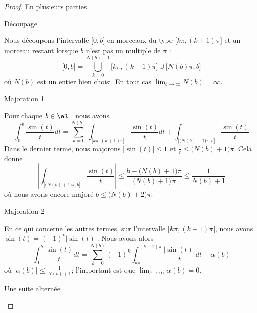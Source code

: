 \begin{proof}
	En plusieurs parties.
	\begin{subproof}
		\item[Découpage]

		Nous découpons l'intervalle \( \mathopen[ 0 , b \mathclose]\) en morceaux du type \( \mathopen[ k\pi , (k+1)\pi \mathclose]\) et un morceau restant lorsque \( b\) n'est pas un multiple de \( \pi\) :
		\begin{equation}
			\mathopen[ 0 , b \mathclose]=\bigcup_{k=0}^{N(b)-1}\mathopen[ k\pi , (k+1)\pi \mathclose]\cup\mathopen[ N(b)\pi , b \mathclose]
		\end{equation}
		où \( N(b)\) est un entier bien choisi. En tout cas \( \lim_{b\to \infty}N(b)=\infty\).

		\item[Majoration 1]

		Pour chaque \( b\in \eR^+\) nous avons
		\begin{equation}
			\int_0^b\frac{ \sin(t) }{ t }dt=\sum_{k=0}^{N(b)}\int_{\mathopen\big[ k\pi , (k+1)\pi \mathclose\big]}\frac{ \sin(t) }{ t }dt+\int_{\mathopen[ \big( N(b)+1 \big)\pi , b \mathclose]}\frac{ \sin(t) }{ t }
		\end{equation}
		Dans le dernier terme, nous majorons \( | \sin(t) |\leq 1\) et \( \frac{1}{ t }\leq \big( N(b)+1 \big)\pi\). Cela donne
		\begin{equation}
			\left|  \int_{\mathopen\big[ \big(N(b)+1\big)\pi  , b \mathclose\big]}\frac{ \sin(t) }{ t } \right|\leq \frac{ b-\big( N(b)+1 \big)\pi }{ \big( N(b)+1 \big)\pi }\leq \frac{1}{ N(b)+1 }
		\end{equation}
		où nous avons encore majoré \( b\leq \big( N(b)+2 \big)\pi\).

		\item[Majoration 2]

		En ce qui concerne les autres termes, sur l'intervalle \( \mathopen[ k\pi , (k+1)\pi \mathclose]\), nous avons \( \sin(t)=(-1)^k| \sin(t) |\). Nous avons alors
		\begin{equation}        \label{EQooHZPRooFuwRWQ}
			\int_0^b\frac{ \sin(t) }{ t }dt=\sum_{k=0}^{N(b)}(-1)^k\int_{k\pi}^{(k+1)\pi}\frac{ | \sin(t) | }{ t }dt+\alpha(b)
		\end{equation}
		où \( | \alpha(b) |\leq \frac{1}{ N(b)+1 }\); l'important est que \( \lim_{b\to \infty}\alpha(b)=0\).

		\item[Une suite alternée]


\end{subproof}
\end{proof}
